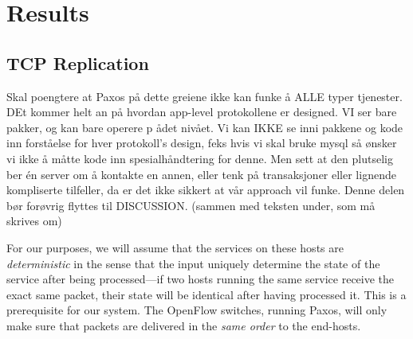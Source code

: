 \chapter{Results}

\section{TCP Replication}
\label{chapter:tcp.replication}



Skal poengtere at Paxos på dette greiene ikke kan funke å ALLE typer
tjenester. DEt kommer helt an på hvordan app-level protokollene er designed.
VI ser bare pakker, og kan bare operere p ådet nivået. Vi kan IKKE se inni
pakkene og kode inn forståelse for hver protokoll's design, feks hvis vi
skal bruke mysql så ønsker vi ikke å måtte kode inn spesialhåndtering for
denne. Men sett at den plutselig ber én server om å kontakte en annen, eller
tenk på transaksjoner eller lignende kompliserte tilfeller, da er det ikke
sikkert at vår approach vil funke.  Denne delen bør forøvrig flyttes til
DISCUSSION. (sammen med teksten under, som må skrives om)

For our purposes, we will assume that the services
on these hosts are \textit{deterministic}
in the sense that the input uniquely determine the
state of the service after being processed---if two hosts running the
same service receive the exact same packet, their state will be
identical after having processed it.  This is a prerequisite for our
system.  The OpenFlow switches, running Paxos, will only make sure that
packets are delivered in the \textit{same order} to the end-hosts.
